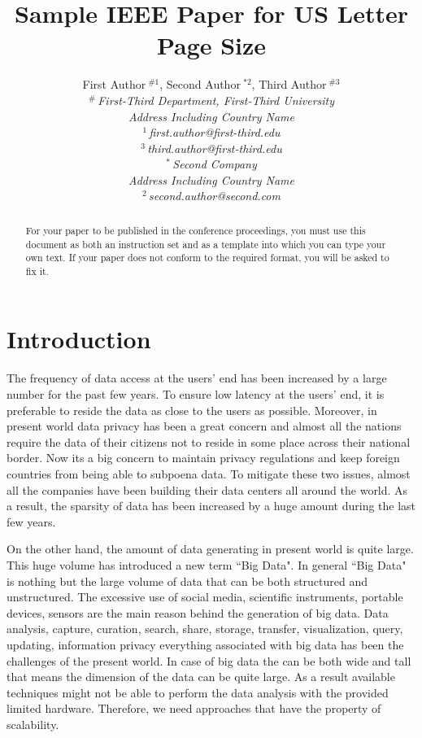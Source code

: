 \documentclass[10pt,conference,letterpaper]{IEEEtran}
\title{Sample IEEE Paper for US Letter Page Size}
\author{%
{First Author{\small $~^{\#1}$}, Second Author{\small $~^{*2}$}, Third Author{\small $~^{\#3}$} }%
\vspace{1.6mm}\\
\fontsize{10}{10}\selectfont\itshape
$^{\#}$\,First-Third Department, First-Third University\\
Address Including Country Name\\
\fontsize{9}{9}\selectfont\ttfamily\upshape
%
$^{1}$\,first.author@first-third.edu\\
$^{3}$\,third.author@first-third.edu%
\vspace{1.2mm}\\
\fontsize{10}{10}\selectfont\rmfamily\itshape
$^{*}$\,Second Company\\
Address Including Country Name\\
\fontsize{9}{9}\selectfont\ttfamily\upshape
$^{2}$\,second.author@second.com
}
\begin{document}
\maketitle
%
\begin{abstract} 
For your paper to be published in the conference proceedings, you must
use this document as both an instruction set and as a template into
which you can type your own text.  If your paper does not conform to
the required format, you will be asked to fix it.
\end{abstract}

%

\section{Introduction}
The frequency of data access at the users' end has been increased by a large number for the past few years. To ensure low latency at the users' end, it is preferable to reside the data as close to the users as possible. Moreover, in present world data privacy has been a great concern and almost all the nations require the data of their citizens not to reside in some place across their national border. Now its a big concern to maintain privacy regulations and keep foreign countries from being able to subpoena data. To mitigate these two issues, almost all the companies have been building their data centers all around the world. As a result, the sparsity of data has been increased by a huge amount during the last few years.

On the other hand, the amount of data generating in present world is quite large. This huge volume has introduced  a new term ``Big Data". In general ``Big Data" is nothing but the large volume of data that can be both structured and unstructured. The excessive use of social media, scientific instruments, portable devices, sensors are the main reason behind the generation of big data. Data analysis, capture, curation, search, share, storage, transfer, visualization, query, updating, information privacy everything associated with big data has been the challenges of the present world. In case of big data the can be both wide and tall that means the dimension of the data can be quite large. As a result available techniques might not be able to perform the data analysis with the provided limited hardware. Therefore, we need  approaches that have the property of scalability.
\end{document}
